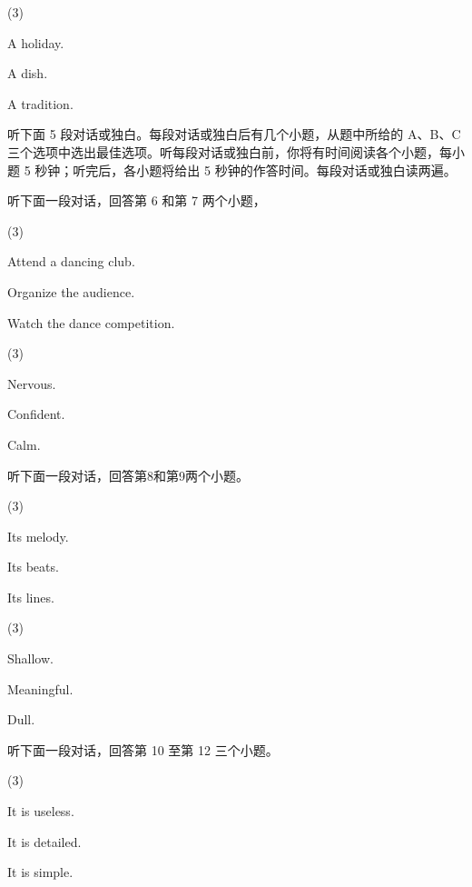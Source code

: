 \documentclass{英语试卷}
\begin{document}
\begin{choices}(3)
  \item A holiday.
  \item A dish.
  \item A tradition.
\end{choices}
\par 听下面 5 段对话或独白。每段对话或独白后有几个小题，从题中所给的 A、B、C 三个选项中选出最佳选项。听每段对话或独白前，你将有时间阅读各个小题，每小题 5 秒钟；听完后，各小题将给出 5 秒钟的作答时间。每段对话或独白读两遍。\par
\par 听下面一段对话，回答第 6 和第 7 两个小题，\par
{}
\begin{choices}(3)
  \item Attend a dancing club.
  \item Organize the audience.
  \item Watch the dance competition.
\end{choices}
\begin{choices}(3)
  \item Nervous.
  \item Confident.
  \item Calm.
\end{choices}
\par 听下面一段对话，回答第8和第9两个小题。\par
{}
\begin{choices}(3)
  \item Its melody.
  \item Its beats.
  \item Its lines.
\end{choices}
\begin{choices}(3)
  \item Shallow.
  \item Meaningful.
  \item Dull.
\end{choices}
\par 听下面一段对话，回答第 10 至第 12 三个小题。\par
{}
\begin{choices}(3)
  \item It is useless.
  \item It is detailed.
  \item It is simple.
\end{choices}
\end{document}
